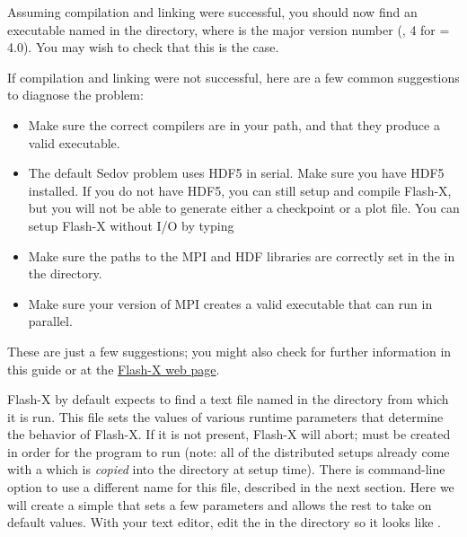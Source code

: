Assuming compilation and linking were successful, you should now
find an executable named  in the 
directory, where  is the major version number (\eg, 4 for
 = 4.0).  You may wish to check that this is the case.


If compilation and linking were not successful, here are a few common
suggestions to diagnose the problem:
\begin{itemize}

\item Make sure the correct compilers are in your path, and that they
produce a valid executable.

\item The default Sedov problem uses HDF5 in serial.  Make sure you
  have HDF5 installed. If you do not have HDF5, you can still setup
  and compile Flash-X, but you will not be able to generate either a
  checkpoint or a plot file.  You can setup Flash-X without I/O by
  typing
  \begin{quote}
  \end{quote}

\item Make sure the paths to the MPI and HDF libraries are correctly set
  in the  in the  directory.

\item Make sure your version of MPI creates a valid executable that
  can run in parallel.

\end{itemize}

These are just a few suggestions; you might also check for further
information in this guide or at the
\href{http://flash.uchicago.edu/codesupport/}{Flash-X web page}.

Flash-X by default expects to find a text file named
in the directory
from which it is run. This file sets the values of various runtime
parameters that determine the behavior of Flash-X. If it is not
present, Flash-X will abort;  must be created in order
for the program to run (note: all of the distributed setups already
come with a  which is \emph{copied} into the
 directory at setup time).  There is command-line option to use a
different name for this file, described in the next section. Here we
will create a simple  that sets a few parameters and
allows the rest to take on default values. With your text editor,
edit the  in the  directory so it looks
like .

